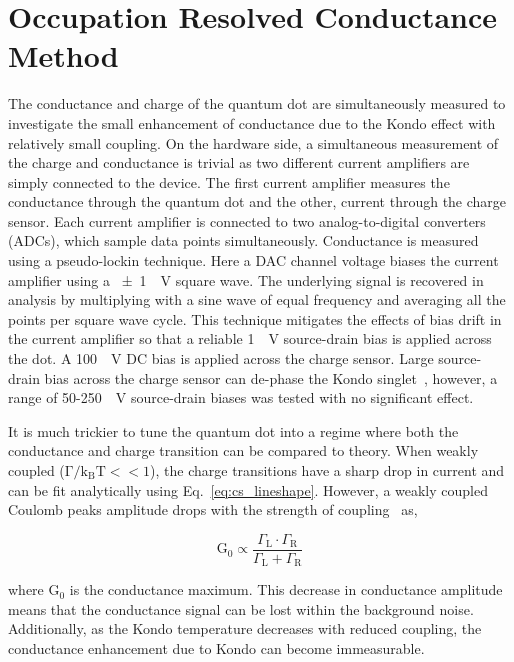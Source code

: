 \section{Occupation Resolved Conductance Method}
The conductance and charge of the quantum dot are simultaneously measured to investigate the small enhancement of conductance due to the Kondo effect with relatively small coupling. On the hardware side, a simultaneous measurement of the charge and conductance is trivial as two different current amplifiers are simply connected to the device. 
The first current amplifier measures the conductance through the quantum dot and the other, current through the charge sensor. Each current amplifier is connected to two analog-to-digital converters (ADCs), which sample data points simultaneously. 
Conductance is measured using a pseudo-lockin technique. Here a DAC channel voltage biases the current amplifier using a \qty{\pm1}{\mu V} square wave. The underlying signal is recovered in analysis by multiplying with a sine wave of equal frequency and averaging all the points per square wave cycle. This technique mitigates the effects of bias drift in the current amplifier so that a reliable \qty{1}{\mu V} source-drain bias is applied across the dot. 
A \qty{100}{\mu V} DC bias is applied across the charge sensor. Large source-drain bias across the charge sensor can de-phase the Kondo singlet~\cite{kondo_controlled_dephasing}, however, a range of 50-\qty{250}{\mu V} source-drain biases was tested with no significant effect.

It is much trickier to tune the quantum dot into a regime where both the conductance and charge transition can be compared to theory. When weakly coupled ($\mathrm{\Gamma/k_BT}<<1$), the charge transitions have a sharp drop in current and can be fit analytically using Eq.~\ref{eq:cs_lineshape}. However, a weakly coupled Coulomb peaks amplitude drops with the strength of coupling~\cite{Kouwenhoven_1997_electron_transport} as,


\begin{equation}\label{eq:cond_amp}
 \mathrm{G_0} \propto
 \frac{\Gamma_\mathrm{L}\cdot\Gamma_\mathrm{R}}{\Gamma_\mathrm{L}+\Gamma_\mathrm{R}}
\end{equation}


\noindent where $\mathrm{G_0}$ is the conductance maximum. This decrease in conductance amplitude means that the conductance signal can be lost within the background noise. Additionally, as the Kondo temperature decreases with reduced coupling, the conductance enhancement due to Kondo can become immeasurable.


